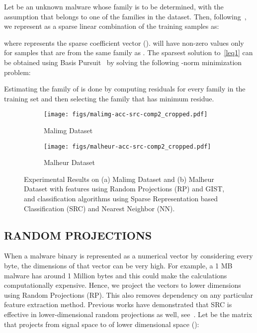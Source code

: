 \documentclass[journal]{IEEEtran}
\begin{document}
Let  be an unknown malware whose family is to be determined, with the assumption that  belongs to one of the families in the dataset. 
Then, following~\cite{2009-pami-wright-face}, we represent  as a sparse linear combination of the training samples as:
 
where  represents the  sparse coefficient vector ().
 will have non-zero values only for samples that are from the same family as . 
The sparsest solution to~\eqref{leq1} can be obtained using Basis Pursuit~\cite{2011-jay-pami} by solving the following -norm minimization problem:



Estimating the family of  is done by computing residuals for every family in the training set and then selecting the family that has minimum residue.

\begin{figure*}[ht]
\centering 
\begin{subfigure}[h]{0.49\textwidth}
{\texttt{[image: figs/malimg-acc-src-comp2\_cropped.pdf]}}    
\caption{Malimg Dataset}
\label{exps-res-malimg}
\end{subfigure}
\begin{subfigure}[h]{0.49\textwidth}
{\texttt{[image: figs/malheur-acc-src-comp2\_cropped.pdf]}} 
\caption{Malheur Dataset}
\label{exps-res-malheur}
\end{subfigure}
\vspace{-5pt}
\caption{Experimental Results on (a) Malimg Dataset and (b)  Malheur Dataset with features using Random Projections (RP) and GIST, and classification algorithms using Sparse Representation based Classification (SRC) and Nearest Neighbor (NN).
}
\label{exps-res}
\vspace{-5pt}
\end{figure*}


\subsection*{RANDOM PROJECTIONS}

When a malware binary is represented as a numerical vector by considering every byte, the dimensions of that vector can be very high.
For example, a 1 MB malware has around 1 Million bytes and this could make the calculations computationally expensive.
Hence, we project the vectors to lower dimensions using Random Projections (RP). 
This also removes dependency on any particular feature extraction method.
Previous works have demonstrated that SRC is effective in lower-dimensional random projections as well, see~\cite{2009-donoho-counting,2009-pami-wright-face, 2011-jay-pami}.
Let  be the matrix that projects  from signal space  to  of lower dimensional space  ():
\end{document}
